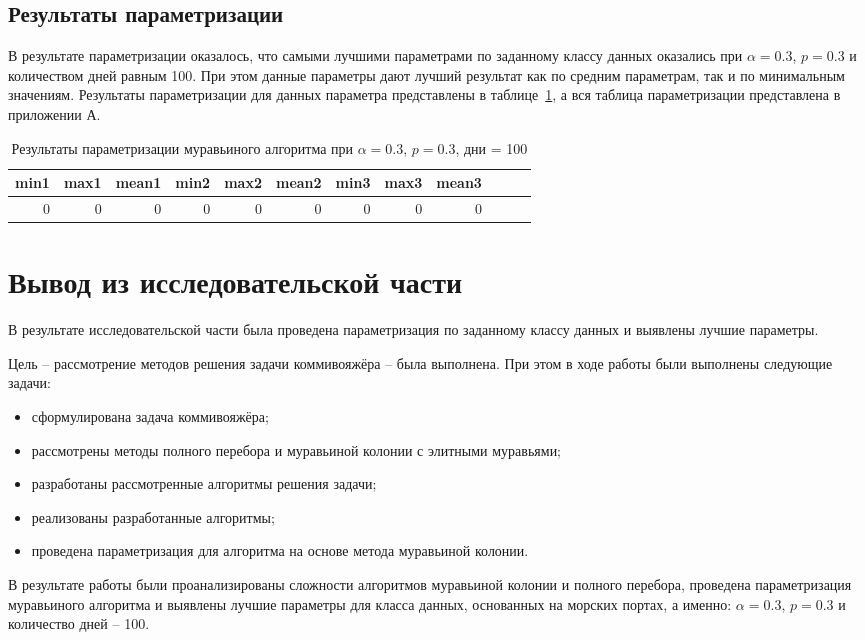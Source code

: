 \subsection{Результаты параметризации}

В результате параметризации оказалось, что самыми лучшими параметрами по заданному классу данных оказались при $\alpha = 0.3$, $p = 0.3$ и количеством дней равным 100. При этом данные параметры дают лучший результат как по средним параметрам, так и по минимальным значениям. Результаты параметризации для данных параметра представлены в таблице~\ref{tbl:d}, а вся таблица параметризации представлена в приложении А.

\begin{table}[H]
    \centering
        \caption{Результаты параметризации муравьиного алгоритма при $\alpha = 0.3$, $p = 0.3$, дни = 100}
    \begin{tabular}{|r|r|r|r|r|r|r|r|r|r|r|r|}
    \hline
    min1 & max1 & mean1 & min2 & max2 & mean2 & min3 & max3 & mean3 \\ \hline
    0 & 0 & 0 & 0 & 0 & 0 & 0 & 0 & 0 \\ \hline
    \end{tabular}
    \label{tbl:d}
\end{table}

\section{Вывод из исследовательской части}

В результате исследовательской части была проведена параметризация по заданному классу данных и выявлены лучшие параметры.

\clearpage


Цель – рассмотрение методов решения задачи коммивояжёра – была выполнена.
При этом в ходе работы были выполнены следующие задачи:

\begin{itemize}
	\item сформулирована задача коммивояжёра;
	\item рассмотрены методы полного перебора и муравьиной колонии с элитными муравьями;
	\item разработаны рассмотренные алгоритмы решения задачи;
	\item реализованы разработанные алгоритмы;
	\item проведена параметризация для алгоритма на основе метода муравьиной колонии. 
\end{itemize}

В результате работы были проанализированы сложности алгоритмов муравьиной колонии и полного перебора, проведена параметризация муравьиного алгоритма и выявлены лучшие параметры для класса данных, основанных на морских портах, а именно: $\alpha = 0.3$, $p = 0.3$ и количество дней -- 100.

\clearpage

